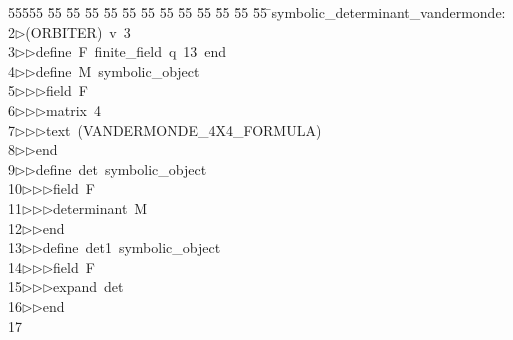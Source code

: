 %
%
\begin{tabbing}
55555 \= 55 \= 55 \= 55 \= 55 \= 55 \= 55 \= 55 \= 55 \= 55 \= 55 \= 55 \= 55 \= \>symbolic\_determinant\_vandermonde:\\[0pt]
2\>$\triangleright$\>(ORBITER)\ v\ 3\ \\[0pt]
3\>$\triangleright$\>$\triangleright$\>define\ F\ finite\_field\ q\ 13\ end\ \\[0pt]
4\>$\triangleright$\>$\triangleright$\>define\ M\ symbolic\_object\ \\[0pt]
5\>$\triangleright$\>$\triangleright$\>$\triangleright$\>field\ F\ \\[0pt]
6\>$\triangleright$\>$\triangleright$\>$\triangleright$\>matrix\ 4\ \\[0pt]
7\>$\triangleright$\>$\triangleright$\>$\triangleright$\>text\ (VANDERMONDE\_4X4\_FORMULA)\ \\[0pt]
8\>$\triangleright$\>$\triangleright$\>end\ \\[0pt]
9\>$\triangleright$\>$\triangleright$\>define\ det\ symbolic\_object\ \\[0pt]
10\>$\triangleright$\>$\triangleright$\>$\triangleright$\>field\ F\ \\[0pt]
11\>$\triangleright$\>$\triangleright$\>$\triangleright$\>determinant\ M\ \\[0pt]
12\>$\triangleright$\>$\triangleright$\>end\ \\[0pt]
13\>$\triangleright$\>$\triangleright$\>define\ det1\ symbolic\_object\ \\[0pt]
14\>$\triangleright$\>$\triangleright$\>$\triangleright$\>field\ F\ \\[0pt]
15\>$\triangleright$\>$\triangleright$\>$\triangleright$\>expand\ det\ \\[0pt]
16\>$\triangleright$\>$\triangleright$\>end\\[0pt]
17\>\end{tabbing}
